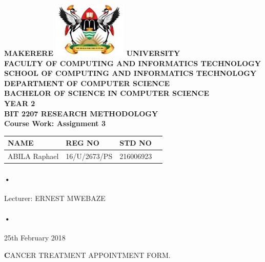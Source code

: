 \documentclass[12pt]{article}
\begin{document}
\begin{Huge}
\begin{center}
\begin{normalsize}
\textbf{MAKERERE \includegraphics[scale=0.5]{logo} UNIVERSITY }\\


\textbf{FACULTY OF COMPUTING AND INFORMATICS TECHNOLOGY} \\
\textbf{SCHOOL OF COMPUTING AND INFORMATICS TECHNOLOGY} \\
\textbf{DEPARTMENT OF COMPUTER SCIENCE} \\
\textbf{BACHELOR OF SCIENCE IN COMPUTER SCIENCE} \\
\textbf{YEAR 2} \\
\textbf{BIT 2207 RESEARCH METHODOLOGY} \\
\textbf{Course Work: Assignment 3}\\
\end{normalsize}
\end{center}
\end{Huge}

\begin{center}
\begin{tabular}{|l|l|l|c|}
\hline NAME  & REG NO & STD NO \\\hline

ABILA Raphael& 16/U/2673/PS & 216006923 \\\hline

\end{tabular}
\paragraph{•}
Lecturer: ERNEST MWEBAZE \\
\paragraph{•}
25th February 2018

\end{center}

\newpage
\title{}\textbf CANCER TREATMENT APPOINTMENT FORM.
\end{document}
